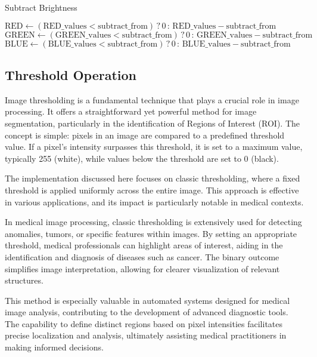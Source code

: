 \begin{algorithm}[H]
	\caption{Subtract Brightness \cite{fpgaipvgarepo}}
	\begin{algorithmic}[1]
		\State {}
		\State $\text{RED} \gets (\text{RED\_values} < \text{subtract\_from}) \, ? \, 0 \, : \, \text{RED\_values} - \text{subtract\_from}$
		\State $\text{GREEN} \gets (\text{GREEN\_values} < \text{subtract\_from}) \, ? \, 0 \, : \, \text{GREEN\_values} - \text{subtract\_from}$
		\State $\text{BLUE} \gets (\text{BLUE\_values} < \text{subtract\_from}) \, ? \, 0 \, : \, \text{BLUE\_values} - \text{subtract\_from}$
		\EndIf
	\end{algorithmic}
\end{algorithm}

\subsection{Threshold Operation}
\par 
Image thresholding is a fundamental technique that plays a crucial role in image processing. It offers a straightforward yet powerful method for image segmentation, particularly in the identification of Regions of Interest (ROI). The concept is simple: pixels in an image are compared to a predefined threshold value. If a pixel's intensity surpasses this threshold, it is set to a maximum value, typically 255 (white), while values below the threshold are set to 0 (black). \newline
\par The implementation discussed here focuses on classic thresholding, where a fixed threshold is applied uniformly across the entire image. This approach is effective in various applications, and its impact is particularly notable in medical contexts. \newline
\par In medical image processing, classic thresholding is extensively used for detecting anomalies, tumors, or specific features within images. By setting an appropriate threshold, medical professionals can highlight areas of interest, aiding in the identification and diagnosis of diseases such as cancer. The binary outcome simplifies image interpretation, allowing for clearer visualization of relevant structures. \newline
\par This method is especially valuable in automated systems designed for medical image analysis, contributing to the development of advanced diagnostic tools. The capability to define distinct regions based on pixel intensities facilitates precise localization and analysis, ultimately assisting medical practitioners in making informed decisions. \newline
